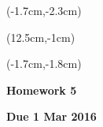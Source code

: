 \documentclass[12pt, oneside]{article}
\begin{document}


\begin{textblock*}{4cm}(-1.7cm,-2.3cm)
\end{textblock*}

\begin{textblock*}{8cm}(12.5cm,-1cm)
\end{textblock*}
\begin{textblock*}{13.5cm}(-1.7cm,-1.8cm)
\end{textblock*}

\vspace{1cm}

\begin{center}
\textbf{\Large Homework 5}

\textbf{Due 1 Mar 2016}
\end{center}
\end{document}
